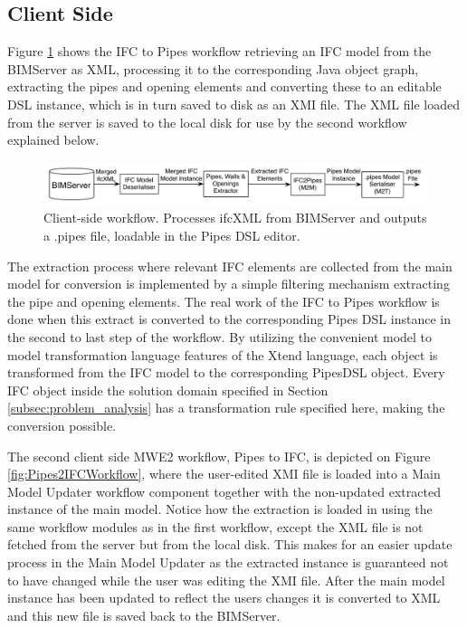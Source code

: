 \subsection{Client Side}
Figure \ref{fig:IFC2PipesWorkflow} shows the IFC to Pipes workflow retrieving an IFC model from the BIMServer as XML, processing it to the corresponding Java object graph, extracting the pipes and opening elements and converting these to an editable DSL instance, which is in turn saved to disk as an XMI file. The XML file loaded from the server is saved to the local disk for use by the second workflow explained below.

\begin{figure}[t]
    \centering
        \includegraphics[width=114mm]{images/IFC2Pipes.pdf}
    \caption{Client-side workflow. Processes ifcXML from BIMServer and outputs a .pipes file, loadable in the Pipes DSL editor.}
    \label{fig:IFC2PipesWorkflow}
\end{figure}

The extraction process where relevant IFC elements are collected from the main model for conversion is implemented by a simple filtering mechanism extracting the pipe and opening elements. The real work of the IFC to Pipes workflow is done when this extract is converted to the corresponding Pipes DSL instance in the second to last step of the workflow. By utilizing the convenient model to model transformation language features of the Xtend language, each object is transformed from the IFC model to the corresponding PipesDSL object. Every IFC object inside the solution domain specified in Section \ref{subsec:problem_analysis} has a transformation rule specified here, making the conversion possible.

The second client side MWE2 workflow, Pipes to IFC, is depicted on Figure \ref{fig:Pipes2IFCWorkflow}, where the user-edited XMI file is loaded into a Main Model Updater workflow component together with the non-updated extracted instance of the main model. Notice how the extraction is loaded in using the same workflow modules as in the first workflow, except the XML file is not fetched from the server but from the local disk. This makes for an easier update process in the Main Model Updater as the extracted instance is guaranteed not to have changed while the user was editing the XMI file. After the main model instance has been updated to reflect the users changes it is converted to XML and this new file is saved back to the BIMServer.


